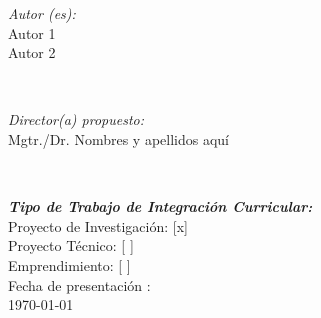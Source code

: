 \begin{titlepage}
\begin{minipage}{0.4\textwidth}
\begin{flushleft} \large
\emph{Autor (es):}\\
Autor 1\\ %
Autor 2
\end{flushleft}
\end{minipage}
~
\begin{minipage}{0.4\textwidth}
\begin{flushright} \large
\emph{Director(a) propuesto:} \\
Mgtr./Dr. Nombres y apellidos aquí \\[1.2em] %

\end{flushright}
\end{minipage}\\[2cm]
\makeatother


\emph{\large \textbf{Tipo de Trabajo de Integración Curricular:}} \\[0.25cm]
Proyecto de Investigación: [x]\\
Proyecto Técnico: [ ]\\
Emprendimiento: [ ]\\[0.5cm]

{\large Fecha de presentación :}\\[0.1cm]
{\large \today}\\[2cm] %

\vfill %

\end{titlepage}